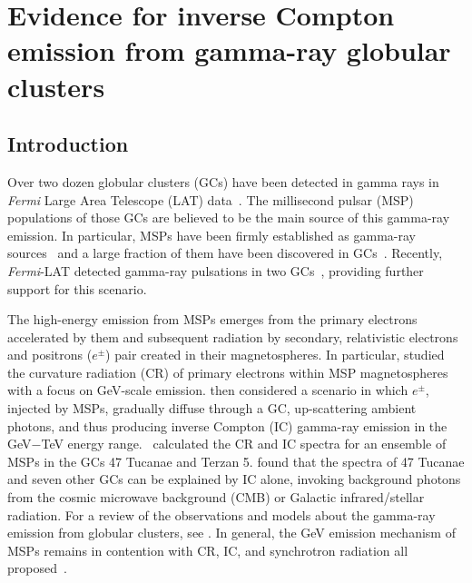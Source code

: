 \documentclass[doublespace,nopageskip]{VTthesis} %
\begin{document}




\chapter{Evidence for inverse Compton emission from gamma-ray globular clusters} \label{ch:globular_cluster}

\section{Introduction}\label{sec:intro}

Over two dozen globular clusters (GCs) have been detected in gamma rays in {\it Fermi} Large Area Telescope (LAT) data~\citep{2009Sci...325..845A,2010A&A...524A..75A,2010ApJ...712L..36K,2011ApJ...729...90T,2015MNRAS.448.3215Z,2016MNRAS.459...99Z}. The millisecond pulsar (MSP) populations of those GCs are believed to be the main source of this gamma-ray emission. In particular, MSPs have been firmly established as gamma-ray sources~\citep{1996A&A...311L...9V,2009ApJ...699.1171A,2013MNRAS.430..571E,2013ApJS..208...17A} and a large fraction of them have been discovered in GCs~\citep{2005ASPC..328..147C}. Recently, \textit{Fermi}-LAT detected gamma-ray pulsations in two GCs~\citep{2011Sci...334.1107F,2013ApJ...778..106J}, providing further support for this scenario.

The high-energy emission from MSPs emerges from the primary electrons accelerated by them and  subsequent radiation by secondary, relativistic electrons and positrons ($e^\pm$) pair created in their magnetospheres. In particular, \citet{2005ApJ...622..531H} studied the curvature radiation (CR) of primary electrons within MSP magnetospheres with a focus on GeV-scale emission. \citet{2007MNRAS.377..920B} then considered a scenario in which $e^\pm$, injected by MSPs, gradually diffuse through a GC, up-scattering ambient photons, and thus producing inverse Compton (IC) gamma-ray emission in the GeV$-$TeV energy range.~\citet{2009ApJ...696L..52V} calculated the CR and IC spectra for an ensemble of MSPs in the GCs 47 Tucanae and Terzan 5. \citet{2010ApJ...723.1219C} found that the spectra of 47 Tucanae and seven other GCs can be explained by IC alone, invoking background photons from the cosmic microwave background (CMB) or Galactic infrared/stellar radiation. {For a review of the observations and models about the gamma-ray emission from globular clusters, see \citet{2016JASS...33....1T}.} In general, the GeV emission mechanism of MSPs remains in contention with CR, IC, and synchrotron radiation all  proposed~\citep{2021arXiv210105751H}.
\end{document}
